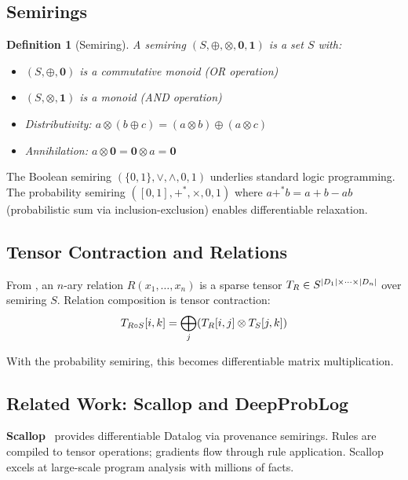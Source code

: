 \documentclass[11pt,a4paper]{article}
\newtheorem{definition}[theorem]{Definition}
\begin{document}
\subsection{Semirings}
\label{subsec:semirings_chirho}

\begin{definition}[Semiring]
\label{def:semiring_chirho}
A \emph{semiring} $(S, \oplus, \otimes, \mathbf{0}, \mathbf{1})$ is a set $S$ with:
\begin{itemize}
  \item $(S, \oplus, \mathbf{0})$ is a commutative monoid (OR operation)
  \item $(S, \otimes, \mathbf{1})$ is a monoid (AND operation)
  \item Distributivity: $a \otimes (b \oplus c) = (a \otimes b) \oplus (a \otimes c)$
  \item Annihilation: $a \otimes \mathbf{0} = \mathbf{0} \otimes a = \mathbf{0}$
\end{itemize}
\end{definition}

The Boolean semiring $(\{0,1\}, \lor, \land, 0, 1)$ underlies standard logic programming.
The probability semiring $([0,1], +^*, \times, 0, 1)$ where $a +^* b = a + b - ab$ (probabilistic sum via inclusion-exclusion) enables differentiable relaxation.

\subsection{Tensor Contraction and Relations}
\label{subsec:tensor_contraction_chirho}

From \paperB{}, an $n$-ary relation $R(x_1, \ldots, x_n)$ is a sparse tensor $T_{R} \in S^{|D_1| \times \cdots \times |D_n|}$ over semiring $S$.
Relation composition is tensor contraction:
\[
T_{R \circ S}[i, k] = \bigoplus_j (T_{R}[i, j] \otimes T_{S}[j, k])
\]

With the probability semiring, this becomes differentiable matrix multiplication.

\subsection{Related Work: Scallop and DeepProbLog}
\label{subsec:related_chirho}

\textbf{Scallop}~\cite{scallop_chirho} provides differentiable Datalog via provenance semirings.
Rules are compiled to tensor operations; gradients flow through rule application.
Scallop excels at large-scale program analysis with millions of facts.
\end{document}
